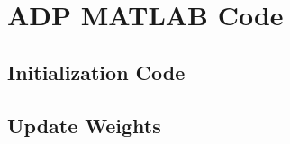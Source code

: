 \chapter{ADP MATLAB Code}

\section{Initialization Code}
\label{ch:RPI3_SPI_Int}


\section{Update Weights}
\label{ch:RPI3_SPI_Int}



